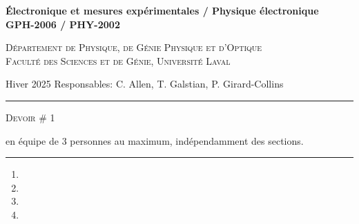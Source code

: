 \documentclass[english,french,12pt]{article}
\newcommand{\onlyinsubfile}[1]{#1} %
\begin{document}
\renewcommand{\onlyinsubfile}[1]{}
%
%
\begin{center}
    \textbf{\large{Électronique et mesures expérimentales / Physique électronique}}\\
    \vspace{0.2em}
    \textbf{GPH-2006 / PHY-2002}\par
    \textsc{Département de Physique, de Génie Physique et d'Optique\\
    Faculté des Sciences et de Génie, Université Laval}
\end{center}
\noindent Hiver 2025 \hfill Responsables: C. Allen, T. Galstian, P. Girard-Collins
\vspace{0.2em}
\hrule
\vspace{-0.5ex}
\begin{center}
    \textsc{Devoir \# 1}\par
    \small{en équipe de 3 personnes au maximum, indépendamment des sections.}
\end{center}
\vspace{-1.2ex}
\hrule
\justify
%

\begin{enumerate}[label=\Roman*., itemsep=3ex, wide, labelwidth=!, labelindent=0pt]
    \setcounter{enumi}{0}
    \vspace{3ex}
    \item 
    \vspace{2ex}
    \item 
    \newpage
    \item 
    \item 
\end{enumerate}
 
\end{document}
